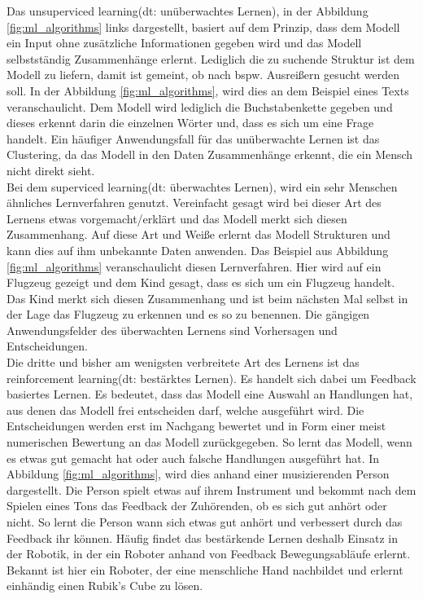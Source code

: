 \begin{onehalfspace}
        Das \glqq{}unsuperviced learning\grqq{}(\ac*{dt}: unüberwachtes Lernen), in der Abbildung \ref*{fig:ml_algorithms} links dargestellt, basiert auf dem Prinzip, dass dem Modell ein Input ohne zusätzliche Informationen gegeben wird und das Modell selbstständig Zusammenhänge erlernt. Lediglich die zu suchende Struktur ist dem Modell zu liefern, damit ist gemeint, ob nach bspw. Ausreißern gesucht werden soll. In der Abbildung  \ref*{fig:ml_algorithms}, wird dies an dem Beispiel eines Texts veranschaulicht. Dem Modell wird lediglich die Buchstabenkette gegeben und dieses erkennt darin die einzelnen Wörter und, dass es sich um eine Frage handelt. Ein häufiger Anwendungsfall für das unüberwachte Lernen ist das Clustering, da das Modell in den Daten Zusammenhänge erkennt, die ein Mensch nicht direkt sieht.\cite{Döbel2018}\cite{Datenkommission2019} \\
        Bei dem \glqq{}superviced learning\grqq{}(\ac*{dt}: überwachtes Lernen), wird ein sehr Menschen ähnliches Lernverfahren genutzt. Vereinfacht gesagt wird bei dieser Art des Lernens etwas vorgemacht/erklärt und das Modell merkt sich diesen Zusammenhang. Auf diese Art und Weiße erlernt das Modell Strukturen und kann dies auf ihm unbekannte Daten anwenden. Das Beispiel aus Abbildung \ref*{fig:ml_algorithms} veranschaulicht diesen Lernverfahren. Hier wird auf ein Flugzeug gezeigt und dem Kind gesagt, dass es sich um ein Flugzeug handelt. Das Kind merkt sich diesen Zusammenhang und ist beim nächsten Mal selbst in der Lage das Flugzeug zu erkennen und es so zu benennen. Die gängigen Anwendungsfelder des überwachten Lernens sind Vorhersagen und Entscheidungen.\cite{Döbel2018} \\
        Die dritte und bisher am wenigsten verbreitete Art des Lernens ist das \glqq{}reinforcement learning\grqq{}(\ac*{dt}: bestärktes Lernen). Es handelt sich dabei um Feedback basiertes Lernen. Es bedeutet, dass das Modell eine Auswahl an Handlungen hat, aus denen das Modell frei entscheiden darf, welche ausgeführt wird. Die Entscheidungen werden erst im Nachgang bewertet und in Form einer meist numerischen Bewertung an das Modell zurückgegeben. So lernt das Modell, wenn es etwas gut gemacht hat oder auch falsche Handlungen ausgeführt hat. In Abbildung \ref*{fig:ml_algorithms}, wird dies anhand einer musizierenden Person dargestellt. Die Person spielt etwas auf ihrem Instrument und bekommt nach dem Spielen eines Tons das Feedback der Zuhörenden, ob es sich gut anhört oder nicht. So lernt die Person wann sich etwas gut anhört und verbessert durch das Feedback ihr können. Häufig findet das bestärkende Lernen deshalb Einsatz in der Robotik, in der ein Roboter anhand von Feedback Bewegungsabläufe erlernt. Bekannt ist hier ein Roboter, der eine menschliche Hand nachbildet und erlernt einhändig einen Rubik’s Cube zu lösen.\cite{Horn2022}\cite{Döbel2018}\cite{Rubik2019}

\end{onehalfspace}
